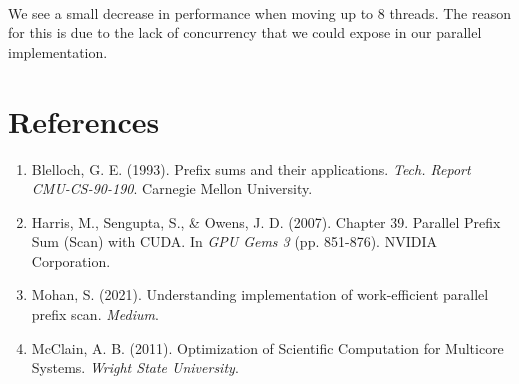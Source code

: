 \\We see a small decrease in performance when moving up to 8 threads. The reason for this is due to the lack of concurrency that we could expose in our parallel implementation. 
\pagebreak
\section{References}
\begin{enumerate}
    \item Blelloch, G. E. (1993). Prefix sums and their applications. \emph{Tech. Report CMU-CS-90-190}. Carnegie Mellon University.
    \item Harris, M., Sengupta, S., \& Owens, J. D. (2007). Chapter 39. Parallel Prefix Sum (Scan) with CUDA. In \emph{GPU Gems 3} (pp. 851-876). NVIDIA Corporation.
    \item Mohan, S. (2021). Understanding implementation of work-efficient parallel prefix scan. \emph{Medium}.
    \item McClain, A. B. (2011). Optimization of Scientific Computation for Multicore Systems. \emph{Wright State University}.
\end{enumerate}
 
